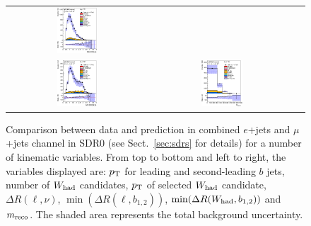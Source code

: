 \begin{figure}[htbp]
\begin{center}
\begin{tabular}{ccc}
\includegraphics[width=0.30\textwidth]{appendices/figures/sdrs/VLQAna_WbX_MinDRlb_ELEMUONCR0_1W_NOMINAL.eps} \\
\includegraphics[width=0.30\textwidth]{appendices/figures/sdrs/VLQAna_WbX_MinDRWb_ELEMUONCR0_1W_NOMINAL.eps} &
\includegraphics[width=0.30\textwidth]{appendices/figures/sdrs/VLQAna_WbX_1W_MWb_4_ELEMUONCR0_1W_NOMINAL.eps} & \\
\end{tabular}\caption{\small {Comparison between data and prediction in combined $e$+jets and $\mu$+jets channel in SDR0 (see Sect.~\ref{sec:sdrs} for details) 
for a number of kinematic variables. From top to bottom and left to right, the variables displayed are: $\pt$ for leading and second-leading $b$ jets,
number of $W_{\rm had}$  candidates, $\pt$ of selected $W_{\rm had}$  candidate, $\Delta R(\ell,\nu)$, $\min(\Delta R(\ell, b_{1,2}))$, 
$\min(\Delta R(W_{\rm had}, b_{1,2}))$ and $m_{\rm reco}$.
The shaded area represents the total background uncertainty.}}
\label{fig:ELEMUONCR0_3}
\end{center}
\end{figure}                                                                             

